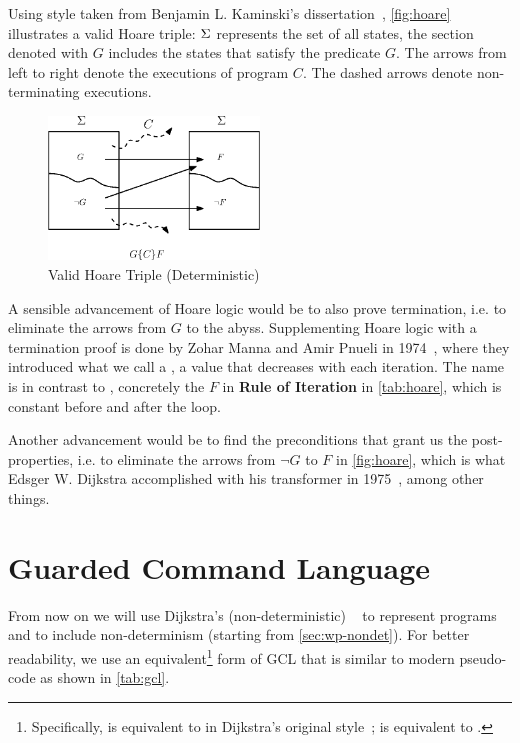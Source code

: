 Using style taken from Benjamin L. Kaminski's dissertation~\cite{kaminski19}, \autoref{fig:hoare} illustrates a valid Hoare triple: $\S$ represents the set of all states, the section denoted with $G$ includes the states that satisfy the predicate $G$. 
The arrows from left to right denote the executions of program $C$. 
The dashed arrows denote non-terminating executions. 

\begin{figure}[ht!]\centering
\includegraphics[width=0.5\textwidth]{image/hoare.eps}
\caption{Valid Hoare Triple (Deterministic)}
\label{fig:hoare}
\end{figure}


A sensible advancement of Hoare logic would be to also prove termination, i.e. to eliminate the arrows from $G$ to the abyss.  
Supplementing Hoare logic with a termination proof is done by Zohar Manna and Amir Pnueli in 1974~\cite{manna74}, where they introduced what we call a , a value that decreases with each iteration. The name is in contrast to , concretely the $F$ in \textbf{Rule of Iteration} in \autoref{tab:hoare}, which is constant before and after the loop. 

Another advancement would be to find the  preconditions that grant us the post-properties, i.e. to eliminate the arrows from $\neg G$ to $F$ in \autoref{fig:hoare}, which  is what Edsger W. Dijkstra accomplished with his  transformer in 1975~\cite{dijkstra75}, among other things. 


\section{Guarded Command Language}\label{sec:gcl}
From now on we will use Dijkstra's (non-deterministic) ~\cite{dijkstra75} to represent programs and to include non-determinism (starting from \autoref{sec:wp-nondet}).
For better readability, we use an equivalent\footnote{Specifically,   is equivalent to
 in Dijkstra's original style~\cite{dijkstra75};  is equivalent to .} 
form of GCL that is similar to modern pseudo-code as shown in \autoref{tab:gcl}. 


